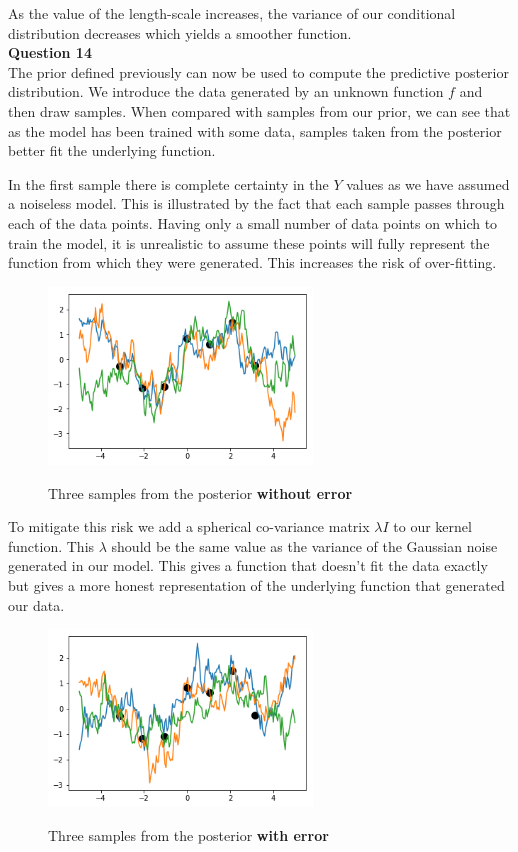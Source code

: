 \documentclass[10pt, a4paper, twocolumn]{article} %
\begin{document}
\begin{enumerate}
   As the value of the length-scale increases, the variance of our conditional distribution decreases which yields a smoother function.\\

  \textbf{Question 14}\\
  The prior defined previously can now be used to compute the predictive posterior distribution. We introduce the data generated by an unknown function $f$ and then draw samples. When compared with samples from our prior, we can see that as the model has been trained with some data, samples taken from the posterior better fit the underlying function.
  
  In the first sample there is complete certainty in the $Y$ values as we have assumed a noiseless model. This is illustrated by the fact that each sample passes through each of the data points. Having only a small number of data points on which to train the model, it is unrealistic to assume these points will fully represent the function from which they were generated. This increases the risk of over-fitting.
  
  \begin{figure}[H]
      \centering
      \includegraphics[width=70mm, scale=0.5]{imagesfinal/Q14_sample_no_error.png}
      \label{fig:Q14_Posterior_no_error}
      \caption{Three samples from the posterior \textbf{without error}}
  \end{figure}
  
  To mitigate this risk we add a spherical co-variance matrix $\lambda I$ to our kernel function. This $\lambda$ should be the same value as the variance of the Gaussian noise generated in our model. This gives a function that doesn't fit the data exactly but gives a more honest representation of the underlying function that generated our data.
   
 \begin{figure}[H]
      \centering
      \includegraphics[width=70mm, scale=0.5]{imagesfinal/Q14_sample_error.png}
      \label{fig:Q14_Posterior_error}
      \caption{Three samples from the posterior \textbf{with error}}
  \end{figure}
 

\end{enumerate}
\end{document}

